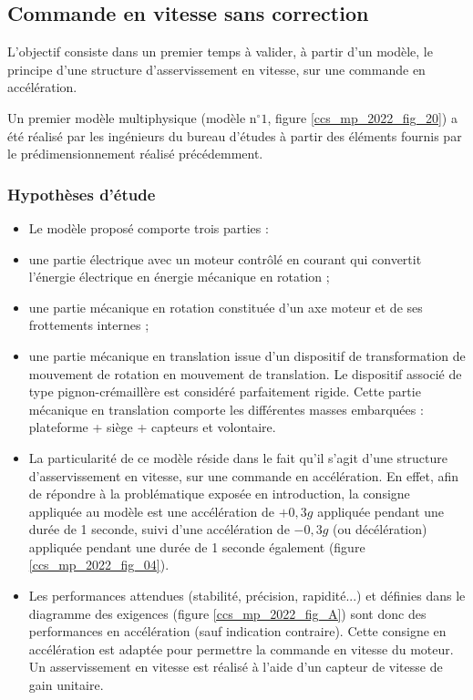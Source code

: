 \subsection{Commande en vitesse sans correction \label{ccs_mp_2022_sec_3A}}
\begin{obj}
L'objectif consiste dans un premier temps à valider, à partir d'un modèle, le principe d'une structure d'asservissement en vitesse, sur une commande en accélération.
\end{obj}

Un premier modèle multiphysique (modèle $\mathrm{n}^{\circ} 1$, figure \ref{ccs_mp_2022_fig_20}) a été réalisé par les ingénieurs du bureau d'études à partir des éléments fournis par le prédimensionnement réalisé précédemment.

\subsubsection*{Hypothèses d'étude}
\begin{itemize}
  \item Le modèle proposé comporte trois parties :
  \item une partie électrique avec un moteur contrôlé en courant qui convertit l'énergie électrique en énergie mécanique en rotation ;
  \item une partie mécanique en rotation constituée d'un axe moteur et de ses frottements internes ;
  \item une partie mécanique en translation issue d'un dispositif de transformation de mouvement de rotation en mouvement de translation. Le dispositif associé de type pignon-crémaillère est considéré parfaitement rigide. Cette partie mécanique en translation comporte les différentes masses embarquées : plateforme + siège + capteurs et volontaire.
  \item La particularité de ce modèle réside dans le fait qu'il s'agit d'une structure d'asservissement en vitesse, sur une commande en accélération. En effet, afin de répondre à la problématique exposée en introduction, la consigne appliquée au modèle est une accélération de $+0,3 g$ appliquée pendant une durée de 1 seconde, suivi d'une accélération de $-0,3 g$ (ou décélération) appliquée pendant une durée de 1 seconde également (figure \ref{ccs_mp_2022_fig_04}).
  \item Les performances attendues (stabilité, précision, rapidité...) et définies dans le diagramme des exigences (figure \ref{ccs_mp_2022_fig_A}) sont donc des performances en accélération (sauf indication contraire). Cette consigne en accélération est adaptée pour permettre la commande en vitesse du moteur. Un asservissement en vitesse est réalisé à l'aide d'un capteur de vitesse de gain unitaire.
\end{itemize}

